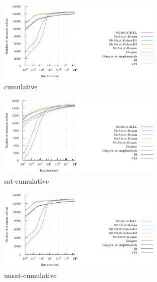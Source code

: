 \begin{figure}[h!]
    \centering
    \includegraphics*[width=0.7\textwidth]{14b-mcsplit-induced-si/decision-instances-experiment/experiment/plots/cumulative}
    \caption{cumulative}
    \label{figure:cumulative}
\end{figure}

\begin{figure}[h!]
    \centering
    \includegraphics*[width=0.7\textwidth]{14b-mcsplit-induced-si/decision-instances-experiment/experiment/plots/sat-cumulative}
    \caption{sat-cumulative}
    \label{figure:sat-cumulative}
\end{figure}

\begin{figure}[h!]
    \centering
    \includegraphics*[width=0.7\textwidth]{14b-mcsplit-induced-si/decision-instances-experiment/experiment/plots/unsat-cumulative}
    \caption{unsat-cumulative}
    \label{figure:unsat-cumulative}
\end{figure}

